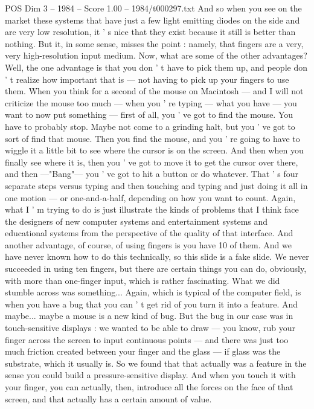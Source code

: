 \begin{textsample}{POS Dim 3 – 1984 – Score 1.00 – 1984/t000297.txt}
And so when you see on the market these systems that have just a few light emitting diodes on the side and are very low resolution, it ' s nice that they exist because it still is better than nothing.
But it, in some sense, misses the point : namely, that fingers are a very, very high-resolution input medium.
Now, what are some of the other advantages?
Well, the one advantage is that you don ' t have to pick them up, and people don ' t realize how important that is — not having to pick up your fingers to use them.
When you think for a second of the mouse on Macintosh — and I will not criticize the mouse too much — when you ' re typing — what you have — you want to now put something — first of all, you ' ve got to find the mouse.
You have to probably stop.
Maybe not come to a grinding halt, but you ' ve got to sort of find that mouse.
Then you find the mouse, and you ' re going to have to wiggle it a little bit to see where the cursor is on the screen.
And then when you finally see where it is, then you ' ve got to move it to get the cursor over there, and then —"Bang"— you ' ve got to hit a button or do whatever.
That ' s four separate steps versus typing and then touching and typing and just doing it all in one motion — or one-and-a-half, depending on how you want to count.
Again, what I ' m trying to do is just illustrate the kinds of problems that I think face the designers of new computer systems and entertainment systems and educational systems from the perspective of the quality of that interface.
And another advantage, of course, of using fingers is you have 10 of them.
And we have never known how to do this technically, so this slide is a fake slide.
We never succeeded in using ten fingers, but there are certain things you can do, obviously, with more than one-finger input, which is rather fascinating.
What we did stumble across was something...
Again, which is typical of the computer field, is when you have a bug that you can ' t get rid of you turn it into a feature.
And maybe... maybe a mouse is a new kind of bug.
But the bug in our case was in touch-sensitive displays : we wanted to be able to draw — you know, rub your finger across the screen to input continuous points — and there was just too much friction created between your finger and the glass — if glass was the substrate, which it usually is.
So we found that that actually was a feature in the sense you could build a pressure-sensitive display.
And when you touch it with your finger, you can actually, then, introduce all the forces on the face of that screen, and that actually has a certain amount of value.

\end{textsample}
